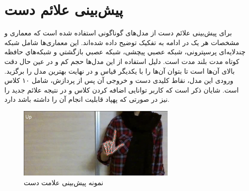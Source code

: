 
\section{پیش‌بینی علائم دست}
برای پیش‌بینی علائم دست از مدل‌های گوناگونی استفاده شده است که معماری و مشخصات هر یک در ادامه به تفکیک توضیح داده‌ شده‌اند. این معماری‌ها شامل شبكه چندلایه‌ای پرسپترونی، شبكه عصبي پیچشی، شبكه عصبي بازگشتي و شبكه‌هاي حافظه كوتاه مدت بلند مدت است. دلیل استفاده از این مدل‌ها حجم کم و در عین حال دقت بالای آن‌ها است تا بتوان آن‌ها را با یکدیگر قیاس و در نهایت بهترین مدل را برگزید. 
ورودی این مدل، نقاط کلیدی دست و خروجی آن پس از پردازش، شامل ۱۰ کلاس است. شایان ذکر است که کاربر توانایی اضافه کردن کلاس و در نتیجه علائم جدید را نیز در صورتی که پهپاد قابلیت انجام آن را داشته باشد دارد.


\begin{figure}[h]
    \centering
    \includegraphics[width=0.7\textwidth]{gesture_UP.png}
    \caption {نمونه پیش‌بینی علامت دست}
\end{figure}



